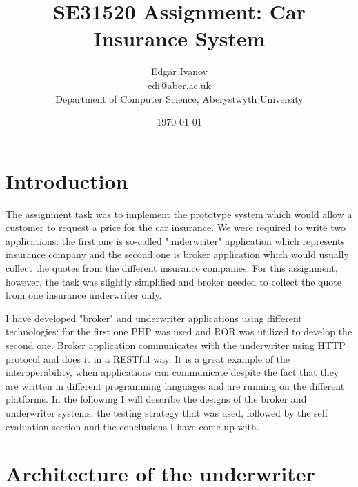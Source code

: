 \documentclass[10pt,a4paper,headinclude=true,twoside]{report}
\begin{document}
\title{SE31520 Assignment: Car Insurance System}
\author{Edgar Ivanov\\ edi@aber.ac.uk \\ Department of Computer Science, Aberystwyth University}
\date{\today}
\maketitle

\newpage
\thispagestyle{empty}
\mbox{}

\tableofcontents

\section{Introduction}
The assignment task was to implement the prototype system which would allow a customer to request a price for the car insurance. We were required to write two applications: the first one is so-called "underwriter" application which represents insurance company and the second one is broker application which would usually collect the quotes from the different insurance companies. For this assignment, however, the task was slightly simplified and broker needed to collect the quote from one insurance underwriter only.

I have developed "broker" and underwriter applications using different technologies: for the first one PHP was used and ROR was utilized to develop the second one. Broker application communicates with the underwriter using HTTP protocol and does it in a RESTful way. It is a great example of the interoperability, when applications can communicate despite the fact that they are written in different programming languages and are running on the different platforms. In the following I will describe the designs of the broker and underwriter systems, the testing strategy that was used, followed by the self evaluation section and the conclusions I have come up with. 

\section{Architecture of the underwriter}
\label{sec:Architectureoftheunderwriter}
\end{document}
